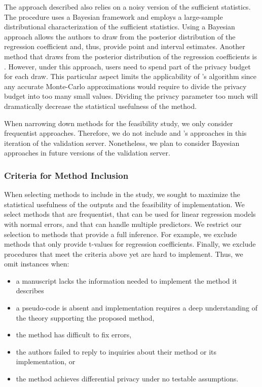 The approach described \cite{bernstein2019differentially} also relies on a noisy version of the sufficient statistics. The procedure uses a Bayesian framework and employs a large-sample distributional characterization of the sufficient statistics. Using a Bayesian approach allows the authors to draw from the posterior distribution of the regression coefficient and, thus, provide point and interval estimates. Another method that draws from the posterior distribution of the regression coefficients is \cite{wang2018revisiting}. However, under this approach, users need to spend part of the privacy budget for each draw. This particular aspect limits the applicability of \cite{wang2018revisiting}'s algorithm since any accurate Monte-Carlo approximations would require to divide the privacy budget into too many small values. Dividing the privacy parameter too much will dramatically decrease the statistical usefulness of the method.

When narrowing down methods for the feasibility study, we only consider frequentist approaches. Therefore, we do not include \cite{bernstein2019differentially} and \cite{wang2018revisiting}'s approaches in this iteration of the validation server. Nonetheless, we plan to consider Bayesian approaches in future versions of the validation server.

\subsubsection{Criteria for Method Inclusion}

When selecting methods to include in the study, we sought to maximize the statistical usefulness of the outputs and the feasibility of implementation. We select methods that are frequentist, that can be used for linear regression models with normal errors, and that can handle multiple predictors. We restrict our selection to methods that provide a full inference. For example, we exclude methods that only provide t-values for regression coefficients. Finally, we exclude procedures that meet the criteria above yet are hard to implement. Thus, we omit instances when: 
\begin{itemize}
    \item a manuscript lacks the information needed to implement the method it describes
    \item a pseudo-code is absent and implementation requires a deep understanding of the theory supporting the proposed method,
    \item the method has difficult to fix errors,
    \item the authors failed to reply to inquiries about their method or its implementation, or
    \item the method achieves differential privacy under no testable assumptions.
\end{itemize}

